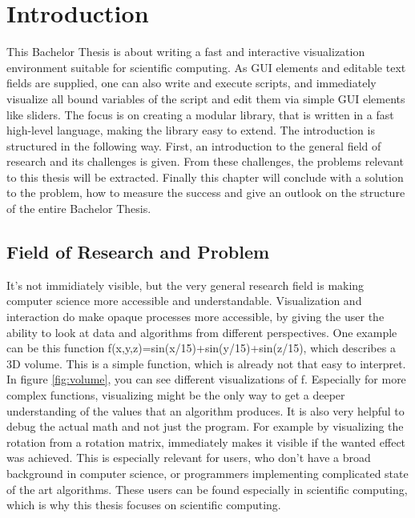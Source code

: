 \section{Introduction}
This Bachelor Thesis is about writing a fast and interactive visualization environment suitable for scientific computing. 
As GUI elements and editable text fields are supplied, one can also write and execute scripts, and immediately visualize all bound variables of the script and edit them via simple GUI elements like sliders. The focus is on creating a modular library, that is written in a fast high-level language, making the library easy to extend.
The introduction is structured in the following way.
First, an introduction to the general field of research and its challenges is given. 
From these challenges, the problems relevant to this thesis will be extracted.
Finally this chapter will conclude with a solution to the problem, how to measure the success and give an outlook on the structure of the entire Bachelor Thesis.
 
\subsection{Field of Research and Problem}


It's not immidiately visible, but the very general research field is making computer science more accessible and understandable. 
Visualization and interaction do make opaque processes more accessible, by giving the user the ability to look at data and algorithms from different perspectives. 
One example can be this function f(x,y,z)=sin(x/15)+sin(y/15)+sin(z/15), which describes a 3D volume. 
This is a simple function, which is already not that easy to interpret. In figure \ref{fig:volume}, you can see different visualizations of f. Especially for more complex functions, visualizing might be the only way to get a deeper understanding of the values that an algorithm produces.
It is also very helpful to debug the actual math and not just the program. For example by visualizing the rotation from a rotation matrix, immediately makes it visible if the wanted effect was achieved.
This is especially relevant for users, who don't have a broad background in computer science, or programmers implementing complicated state of the art algorithms.
These users can be found especially in scientific computing, which is why this thesis focuses on scientific computing. 

